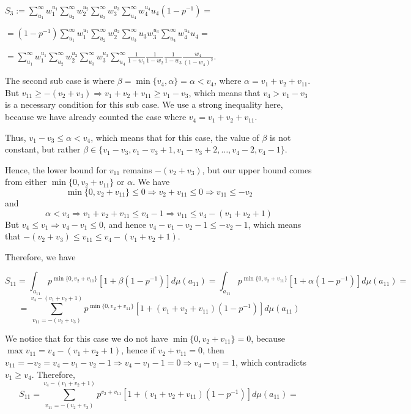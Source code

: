 \documentclass{article}
\begin{document}
$S_{3}:=\sum_{u_{1}}^{\infty}w_{1}^{u_{1}}\sum_{u_{2}}^{\infty}w_{2}^{u_{2}}\sum_{u_{3}}^{\infty}w_{3}^{u_{3}}\sum_{u_{4}}^{\infty}w_{4}^{u_{4}}u_{4}(1-p^{-1})=$

$=(1-p^{-1})\sum_{u_{1}}^{\infty}w_{1}^{u_{1}}\sum_{u_{2}}^{\infty}w_{2}^{u_{2}}\sum_{u_{3}}^{\infty}u_{3}w_{3}^{u_{3}}\sum_{u_{4}}^{\infty}w_{4}^{u_{4}}u_{4}=$

$=\sum_{u_{1}}^{\infty}w_{1}^{u_{1}}\sum_{u_{2}}^{\infty}w_{2}^{u_{2}}\sum_{u_{3}}^{\infty}w_{3}^{u_{3}}\sum_{u_{4}}^{\infty}\frac{1}{1-w_{1}}\frac{1}{1-w_{2}}\frac{1}{1-w_{3}}\frac{w_{4}}{(1-w_{4})^{2}}$.

The second sub case is where $\beta=\min\{v_4,\alpha\}=\alpha<v_{4}$, where $\alpha=v_1+v_2+v_{11}$. 
But $v_{11}\geq{-(v_2+v_3)}\Rightarrow{v_1+v_2+v_{11}\geq{v_1-v_3}}$, which means that ${v_{4}>v_1-v_3}$ is a necessary condition for this sub case. We use a strong inequality here, because we have already counted the case where $v_4=v_1+v_2+v_{11}$.

Thus, $v_1-v_3\leq\alpha<v_4$, which means that for this case, the value of $\beta$ is not constant, but rather $\beta\in\{v_1-v_3,v_1-v_3+1,v_1-v_3+2,\dots,v_4-2,v_4-1\}$.

Hence, the lower bound for $v_{11}$ remains $-(v_2+v_3)$, but our upper bound comes from either $\min\{0,v_2+v_{11}\}$ or $\alpha$. We have \[\min\{0,v_2+v_{11}\}\leq{0}\Rightarrow{v_2+v_{11}\leq{0}}\Rightarrow{v_{11}\leq{-v_2}}\] 
and \[\alpha<v_4\Rightarrow{v_1+v_2+v_{11}\leq{v_4-1}}\Rightarrow{v_{11}\leq{v_4-(v_1+v_2+1)}}\]
But $v_4\leq{v_1}\Rightarrow{v_4-v_1\leq{0}}$, and hence $v_4-v_1-v_2-1\leq{-v_2-1}$, which means that $-(v_2+v_3)\leq{v_{11}}\leq{v_4-(v_1+v_2+1)}$.

Therefore, we have

\[S_{11}=\displaystyle\int_{a_{11}}p^{\min\{0,v_{2}+v_{11}\}}[1+\beta(1-p^{-1})]d\mu(a_{11})=\displaystyle\int_{a_{11}}p^{\min\{0,v_{2}+v_{11}\}}[1+\alpha(1-p^{-1})]d\mu(a_{11})=\]
\[=\sum_{v_{11}=-(v_2+v_3)}^{v_{4}-(v_1+v_2+1)}p^{\min\{0,v_2+v_{11}\}}[1+(v_1+v_2+v_{11})(1-p^{-1})]d\mu(a_{11})\]

We notice that for this case we do not have $\min\{0,v_2+v_{11}\}=0$, because $\max{v_{11}}=v_4-(v_1+v_2+1)$, hence if $v_2+v_{11}=0$, then $v_{11}=-v_2=v_4-v_1-v_2-1\Rightarrow{v_4-v_1-1=0}\Rightarrow{v_4-v_1=1}$, which contradicts $v_1\geq{v_4}$. Therefore,
\[S_{11}=\sum_{v_{11}=-(v_2+v_3)}^{v_{4}-(v_1+v_2+1)}p^{v_2+v_{11}}[1+(v_1+v_2+v_{11})(1-p^{-1})]d\mu(a_{11})=\]
\end{document}
